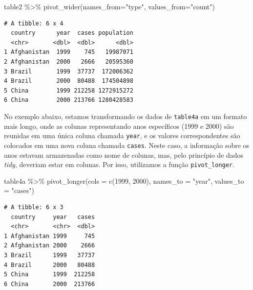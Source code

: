 \documentclass[
  portuguese,
  letterpaper,
  DIV=11,
  numbers=noendperiod]{scrreprt}
\newenvironment{Shaded}{\begin{snugshade}}{\end{snugshade}}
\newcommand{\AttributeTok}[1]{\textcolor[rgb]{0.40,0.45,0.13}{#1}}
\newcommand{\FunctionTok}[1]{\textcolor[rgb]{0.28,0.35,0.67}{#1}}
\newcommand{\NormalTok}[1]{\textcolor[rgb]{0.00,0.23,0.31}{#1}}
\newcommand{\SpecialCharTok}[1]{\textcolor[rgb]{0.37,0.37,0.37}{#1}}
\newcommand{\StringTok}[1]{\textcolor[rgb]{0.13,0.47,0.30}{#1}}
\theoremstyle{definition}
\theoremstyle{remark}
\begin{document}
\begin{Shaded}
\begin{Highlighting}[]
\NormalTok{table2 }\SpecialCharTok{\%\textgreater{}\%} 
  \FunctionTok{pivot\_wider}\NormalTok{(}\AttributeTok{names\_from=}\StringTok{"type"}\NormalTok{, }\AttributeTok{values\_from=}\StringTok{"count"}\NormalTok{)}
\end{Highlighting}
\end{Shaded}

\begin{verbatim}
# A tibble: 6 x 4
  country      year  cases population
  <chr>       <dbl>  <dbl>      <dbl>
1 Afghanistan  1999    745   19987071
2 Afghanistan  2000   2666   20595360
3 Brazil       1999  37737  172006362
4 Brazil       2000  80488  174504898
5 China        1999 212258 1272915272
6 China        2000 213766 1280428583
\end{verbatim}

No exemplo abaixo, estamos transformando os dados de \texttt{table4a} em
um formato mais longo, onde as colunas representando anos específicos
(1999 e 2000) são reunidas em uma única coluna chamada \texttt{year}, e
os valores correspondentes são colocados em uma nova coluna chamada
\texttt{cases}. Neste caso, a informação sobre os anos estavam
armazenadas como nome de colunas, mas, pelo princípio de dados
\emph{tidy}, deveriam estar em colunas. Por isso, utilizamos a função
\texttt{pivot\_longer}.

\begin{Shaded}
\begin{Highlighting}[]
\NormalTok{table4a }\SpecialCharTok{\%\textgreater{}\%} 
  \FunctionTok{pivot\_longer}\NormalTok{(}\AttributeTok{cols =} \FunctionTok{c}\NormalTok{(}\StringTok{\textasciigrave{}}\AttributeTok{1999}\StringTok{\textasciigrave{}}\NormalTok{, }\StringTok{\textasciigrave{}}\AttributeTok{2000}\StringTok{\textasciigrave{}}\NormalTok{), }\AttributeTok{names\_to =} \StringTok{"year"}\NormalTok{, }\AttributeTok{values\_to =} \StringTok{"cases"}\NormalTok{)}
\end{Highlighting}
\end{Shaded}

\begin{verbatim}
# A tibble: 6 x 3
  country     year   cases
  <chr>       <chr>  <dbl>
1 Afghanistan 1999     745
2 Afghanistan 2000    2666
3 Brazil      1999   37737
4 Brazil      2000   80488
5 China       1999  212258
6 China       2000  213766
\end{verbatim}
\end{document}
